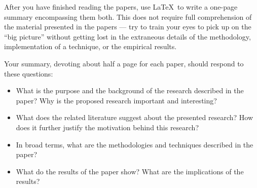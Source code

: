   After you have finished reading the papers, use \LaTeX\ to write a one-page summary encompassing them both.  This does
  not require full comprehension of the material presented in the papers --- try to train your eyes to pick up on the
  ``big picture'' without getting lost in the extraneous details of the methodology, implementation of a technique, or
  the empirical results.

  Your summary, devoting about half a page for each paper, should respond to these questions:

\begin{itemize}
  \itemsep0in
  \item What is the purpose and the background of the research described in the paper? Why is the proposed research
    important and interesting?

  \item What does the related literature suggest about the presented research? How does it further justify the motivation
    behind this research?

  \item In broad terms, what are the methodologies and techniques described in the paper? 

  \item What do the results of the paper show? What are the implications of the results?

\end{itemize}


